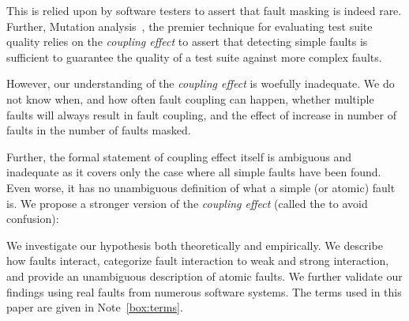 \documentclass[preprint,nonatbib]{sigplanconf}\usepackage[]{graphicx}\usepackage[]{color}
\begin{document}
This is relied upon by software testers to assert that fault masking is indeed
rare. Further, Mutation analysis~\cite{lipton1971fault,budd1979mutation}, the
premier technique for evaluating test suite quality relies on the \emph{coupling
effect} to assert that detecting simple faults is sufficient to guarantee the
quality of a test suite against more complex faults.

However, our understanding of the \emph{coupling effect} is woefully
inadequate. We do not know when, and how often fault coupling can happen,
whether multiple faults will always result in fault coupling, and the effect of
increase in number of faults in the number of faults masked.

Further, the formal statement of coupling effect itself is ambiguous and
inadequate as it covers only the case where all simple faults have been found.
Even worse, it has no unambiguous definition of what a simple (or atomic) fault
is. We propose a stronger version of the \emph{coupling effect}
(called the \efaultT to avoid confusion):

\textit{
  \cHypothesis
}


We investigate our hypothesis both theoretically and empirically. We describe
how faults interact, categorize fault interaction to weak and strong
interaction, and provide an unambiguous description of atomic faults. We further
validate our findings using real faults from numerous software systems.
The terms used in this paper are given in Note~\ref{box:terms}.
\end{document}
